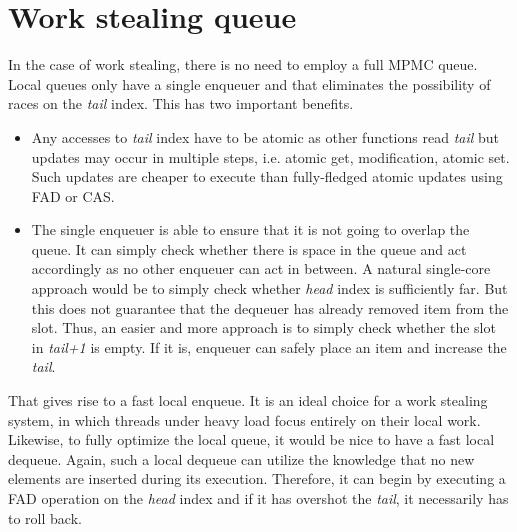 \documentclass[12pt,a4paper,twoside]{report}
\begin{document}
\section{Work stealing queue}
\label{section:wss-queue}

In the case of work stealing, there is no need to employ a full MPMC queue. Local queues only have a single enqueuer and that eliminates the possibility of races on the \textit{tail} index. This has two important benefits.
\begin{itemize}
    \item Any accesses to \textit{tail} index have to be atomic as other functions read \textit{tail} but updates may occur in multiple steps, i.e. atomic get, modification, atomic set. Such updates are cheaper to execute than fully-fledged atomic updates using FAD or CAS. 
    \item The single enqueuer is able to ensure that it is not going to overlap the queue. It can simply check whether there is space in the queue and act accordingly as no other enqueuer can act in between. A natural single-core approach would be to simply check whether \textit{head} index is sufficiently far. But this does not guarantee that the dequeuer has already removed item from the slot. Thus, an easier and more approach is to simply check whether the slot in \textit{tail+1} is empty. If it is, enqueuer can safely place an item and increase the \textit{tail}.
\end{itemize}

That gives rise to a fast local enqueue. It is an ideal choice for a work stealing system, in which threads under heavy load focus entirely on their local work. Likewise, to fully optimize the local queue, it would be nice to have a fast local dequeue. Again, such a local dequeue can utilize the knowledge that no new elements are inserted during its execution. Therefore, it can begin by executing a FAD operation on the \textit{head} index and if it has overshot the \textit{tail}, it necessarily has to roll back. 
\end{document}
